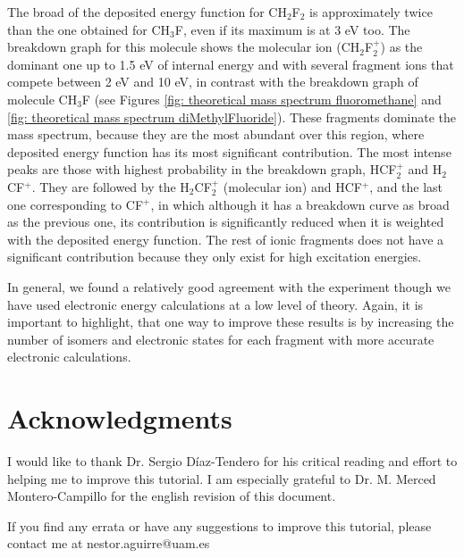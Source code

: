\documentclass[a4paper,12pt]{article}
\begin{document}
The broad of the deposited energy function for CH$_2$F$_2$ is approximately twice than the one obtained for CH$_3$F, even if its maximum is at 3 eV too.
The breakdown graph for this molecule shows the molecular ion (CH$_2$F$_2^+$) as the dominant one up to 1.5 eV of internal energy and with several fragment ions 
that compete between 2 eV and 10 eV, in contrast with the breakdown graph of molecule CH$_3$F (see 
Figures \ref{fig: theoretical mass spectrum fluoromethane} and \ref{fig: theoretical mass spectrum diMethylFluoride}). These fragments dominate the mass 
spectrum, because they are the most abundant over this region, where deposited energy function has its most significant contribution. The most intense peaks 
are those with highest probability in the breakdown graph, HCF$_2^+$ and H$_2$CF$^+$. They are followed by the H$_2$CF$_2^+$ (molecular ion) and 
HCF$^+$, and the last one corresponding to CF$^+$, in which although it has a 
breakdown curve as broad as the previous one, its contribution is significantly reduced when it is weighted with the deposited energy function. The rest of 
ionic fragments does not have a significant contribution because they only exist for high excitation energies. 

In general, we found a relatively good agreement with the experiment though we have used electronic energy calculations at a low level of theory. Again, it is 
important to highlight, that one way to improve these results is by increasing the number of isomers and electronic states for each fragment with more accurate 
electronic calculations.


\section*{Acknowledgments}
I would like to thank Dr. Sergio Díaz-Tendero for his critical reading and effort to helping me to improve this tutorial.
I am especially grateful to Dr. M. Merced Montero-Campillo for the english revision of this document.

\vspace{3cm}
If you find any errata or have any suggestions to improve this tutorial, please contact me at nestor.aguirre@uam.es
\end{document}
